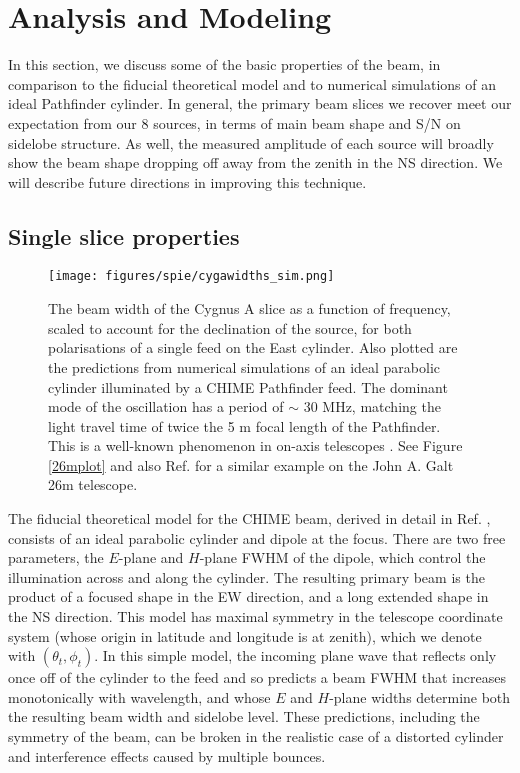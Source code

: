 \section{Analysis and Modeling} \label{ch:hol:sec:analysis}

In this section, we discuss some of the basic properties of the beam, in comparison to the fiducial theoretical model and to numerical simulations of an ideal Pathfinder cylinder. In general, the primary beam slices we recover meet our expectation from our 8 sources, in terms of main beam shape and S/N on sidelobe structure. As well, the measured amplitude of each source will broadly show the beam shape dropping off away from the zenith in the NS direction. We will describe future directions in improving this technique.

\subsection{Single slice properties}

\begin{figure}[h!] %
	\centering
	\texttt{[image: figures/spie/cygawidths\_sim.png]}%
	\caption{The beam width of the Cygnus A slice as a function of frequency, scaled to account for the declination of the source, for both polarisations of a single feed on the East cylinder. Also plotted are the predictions from numerical simulations of an ideal parabolic cylinder illuminated by a CHIME Pathfinder feed. The dominant mode of the oscillation has a period of $\sim$ 30 MHz, matching the light travel time of twice the 5 m focal length of the Pathfinder. This is a well-known phenomenon in on-axis telescopes \citep{wander1, wander2}. See Figure \ref{26mplot} and also Ref. \citep{wolleben1} for a similar example on the John A. Galt 26m telescope.}
	\label{beamwidths}
\end{figure}

The fiducial theoretical model for the CHIME beam, derived in detail in Ref. \citep{mmodes2}, consists of an ideal parabolic cylinder and dipole at the focus. There are two free parameters, the $E$-plane and $H$-plane FWHM of the dipole, which control the illumination across and along the cylinder. The resulting primary beam is the product of a focused shape in the EW direction, and a long extended shape in the NS direction. This model has maximal symmetry in the telescope coordinate system (whose origin in latitude and longitude is at zenith), which we denote with $(\theta_t, \phi_t)$. In this simple model, the incoming plane wave that reflects only once off of the cylinder to the feed and so predicts a beam FWHM that increases monotonically with wavelength, and whose $E$ and $H$-plane widths determine both the resulting beam width and sidelobe level. These predictions, including the symmetry of the beam, can be broken in the realistic case of a distorted cylinder and interference effects caused by multiple bounces. 

